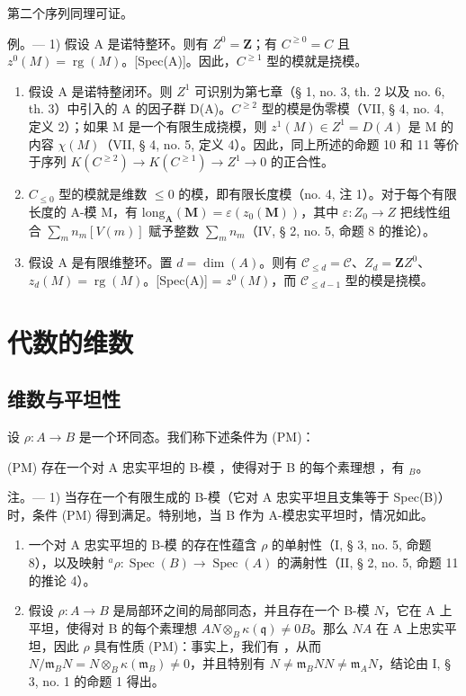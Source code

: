 第二个序列同理可证。

例。--- 1) 假设 A 是诺特整环。则有 \(Z^0 = \mathbf{Z}\){}{}；有 \(C^{\geqslant 0} = C\) 且 \(z^0(M) = \operatorname{rg}(M)\)。[Spec(A)]。因此，\(C^{\geqslant 1}\) 型的模就是挠模。

\begin{enumerate}
\def\labelenumi{\arabic{enumi})}
\setcounter{enumi}{1}
\item
  假设 A 是诺特整闭环。则 \(Z^1\) 可识别为第七章（§ 1, no. 3, th. 2 以及 no. 6, th. 3）中引入的 A 的因子群 D(A)。\(C^{\geqslant 2}\) 型的模是伪零模（VII, § 4, no. 4, 定义 2）；如果 M 是一个有限生成挠模，则 \(z^1(M) \in Z^1 = D(A)\) 是 M 的内容 \(\chi(M)\)（VII, § 4, no. 5, 定义 4）。因此，同上所述的命题 10 和 11 等价于序列 \(K(C^{\geqslant 2}) \to K(C^{\geqslant 1}) \to Z^1 \to 0\) 的正合性。
\item
  \(C_{\leqslant0}\) 型的模就是维数 \(\leqslant0\) 的模，即有限长度模（no. 4, 注 1）。对于每个有限长度的 A-模 M，有 \(\text{long}_{\mathbf{A}}(\mathbf{M}) = \varepsilon(z_0(\mathbf{M}))\)，其中 \(\varepsilon: Z_0 \to Z\) 把线性组合 \(\sum_{m} n_{m}[V(m)]\) 赋予整数 \(\sum_{m} n_{m}\)（IV, § 2, no. 5, 命题 8 的推论）。
\item
  假设 A 是有限维整环。置 \(d = \dim(A)\)。则有 \(\mathcal{C}_{\leq d} = \mathcal{C}\)、\(Z_d = \mathbf{Z}\){}{}\(Z^0\)、\(z_d(M) = \operatorname{rg}(M)\)。[Spec(A)] = \(z^0(M)\)，而 \(\mathcal{C}_{\leq d-1}\) 型的模是挠模。
\end{enumerate}

\section{代数的维数}

\subsection{维数与平坦性}

设 \(\rho: A \to B\) 是一个环同态。我们称下述条件为 (PM)：

(PM) 存在一个对 A 忠实平坦的 B-模  ，使得对于 B 的每个素理想  ，有 \(_{B}\)。

注。--- 1) 当存在一个有限生成的 B-模（它对 A 忠实平坦且支集等于 Spec(B)）时，条件 (PM) 得到满足。特别地，当 B 作为 A-模忠实平坦时，情况如此。

\begin{enumerate}
\def\labelenumi{\arabic{enumi})}
\setcounter{enumi}{1}
\item
  一个对 A 忠实平坦的 B-模  的存在性蕴含 \(\rho\) 的单射性（I, § 3, no. 5, 命题 8），以及映射 \({}^{a}\rho : \operatorname{Spec}(B) \to \operatorname{Spec}(A)\) 的满射性（II, § 2, no. 5, 命题 11 的推论 4）。
\item
假设 \(\rho: A \to B\) 是局部环之间的局部同态，并且存在一个 B-模 \(N\)，它在 A 上平坦，使得对 B 的每个素理想 \(A\)\(N \otimes_B \kappa(\mathfrak{q}) \neq 0\)\(B\)。那么 \(N\)\(A\) 在 A 上忠实平坦，因此 \(\rho\) 具有性质 (PM)：事实上，我们有  ，从而 \(N/\mathfrak{m}_{B}N = N \otimes_B \kappa(\mathfrak{m}_{B}) \neq 0\)，并且特别有 \(N \neq \mathfrak{m}_{B}N\)\(N \neq \mathfrak{m}_{A}N\)，结论由 I, § 3, no. 1 的命题 1 得出。
\end{enumerate}

